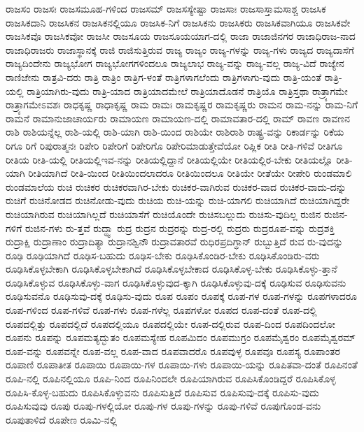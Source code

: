 {ರಾಜಸಂ
ರಾಜಸಃ
ರಾಜಸಮೂಹ-ಗಳಿಂದ
ರಾಜಸಮ್
ರಾಜಸಸ್ಯೇಷ್ಟಾ
ರಾಜಸಾಃ
ರಾಜಸಾಸ್ತಾಮಸಾಶ್ಚ
ರಾಜಸಿಕ
ರಾಜಸಿಕದಾನಿ
ರಾಜಸಿಕನ
ರಾಜಸಿಕನಲ್ಲಿಯೂ
ರಾಜಸಿಕ-ನಿಗೆ
ರಾಜಸಿಕನು
ರಾಜಸಿಕರು
ರಾಜಸಿಕವಾಗಿಯೂ
ರಾಜಸಿಕವೇ
ರಾಜಸಿಕವೊ
ರಾಜಸಿಕವೋ
ರಾಜಸೀ
ರಾಜಸೂಯ
ರಾಜಸೂಯಯಾಗ-ದಲ್ಲಿ
ರಾಜಾ
ರಾಜಾಜಿನಗರ
ರಾಜಾಧಿರಾಜ-ನಾದ
ರಾಜಾಧಿರಾಜರು
ರಾಜಾಸ್ಥಾನಕ್ಕೆ
ರಾಜಿ
ರಾಜಿಸುತ್ತಿರುವ
ರಾಜ್ಯ
ರಾಜ್ಯಂ
ರಾಜ್ಯ-ಗಳನ್ನು
ರಾಜ್ಯ-ಗಳು
ರಾಜ್ಯದ
ರಾಜ್ಯದಾಸೆಗೆ
ರಾಜ್ಯದಿಂದೇನು
ರಾಜ್ಯಭೋಗ
ರಾಜ್ಯಭೋಗಗಳಿಂದಲೂ
ರಾಜ್ಯಲಾಭ
ರಾಜ್ಯ-ವನ್ನು
ರಾಜ್ಯ-ವಲ್ಲ
ರಾಜ್ಯ-ವಿದೆ
ರಾಜ್ಯೇನ
ರಾಣಿಜೇನು
ರಾತ್ರವಿ-ದರು
ರಾತ್ರಿ
ರಾತ್ರಿಂ
ರಾತ್ರಿಗ-ಳಂತೆ
ರಾತ್ರಿಗಳಾಗಲೆಂದು
ರಾತ್ರಿಗಳಾಗು-ವುದು
ರಾತ್ರಿ-ಯಂತೆ
ರಾತ್ರಿ-ಯಲ್ಲಿ
ರಾತ್ರಿಯಾಗಿರು-ವುದು
ರಾತ್ರಿ-ಯಾದ
ರಾತ್ರಿಯಾದಮೇಲೆ
ರಾತ್ರಿಯಾದೊಡನೆ
ರಾತ್ರಿಯೊ
ರಾತ್ರಿಸ್ತಥಾ
ರಾತ್ರ್ಯಾಗಮೇ
ರಾತ್ರ್ಯಾಗಮೇಽವಶಃ
ರಾಧಕೃಷ್ಣ
ರಾಧಾಕೃಷ್ಣ
ರಾಮ
ರಾಮಃ
ರಾಮಕೃಷ್ಣರ
ರಾಮಕೃಷ್ಣರು
ರಾಮನ
ರಾಮ-ನನ್ನು
ರಾಮ-ನಿಗೆ
ರಾಮನೆ
ರಾಮಾನುಜಾಚಾರ್ಯರು
ರಾಮಾಯಣ
ರಾಮಾಯಣ-ದಲ್ಲಿ
ರಾಮಾವತಾರ-ದಲ್ಲಿ
ರಾಮ್
ರಾವಣ
ರಾವಣನ
ರಾಶಿ
ರಾಶಿಯನ್ನೆಲ್ಲ
ರಾಶಿ-ಯಲ್ಲಿ
ರಾಶಿ-ಯಾಗಿ
ರಾಶಿ-ಯಿಂದ
ರಾಶಿಯೇ
ರಾಶಿರಾಶಿ
ರಾಷ್ಟ್ರ-ವನ್ನು
ರಿಕಾರ್ಡನ್ನು
ರಿಕೆಯ
ರಿಗೂ
ರಿಗೆ
ರಿಪುರಾತ್ಮನಃ
ರಿಪೇರಿ
ರಿಪೇರಿಗೆ
ರಿಪೇರಿಗೊ
ರಿಪೇರಿಮಾಡುತ್ತೇವೆಯೋ
ರಿಪ್ಲಿಕ
ರೀತಿ
ರೀತಿ-ಗಳಿವೆ
ರೀತಿಗೂ
ರೀತಿಯ
ರೀತಿ-ಯಲ್ಲಿ
ರೀತಿಯಲ್ಲಿಇವ-ನನ್ನು
ರೀತಿಯಲ್ಲಿದ್ದಾನೆ
ರೀತಿಯಲ್ಲಿಯೇ
ರೀತಿಯಲ್ಲಿರ-ಬೇಕು
ರೀತಿಯಲ್ಲೊ
ರೀತಿ-ಯಾಗಿ
ರೀತಿಯಾಗಿದೆ
ರೀತಿ-ಯಿಂದ
ರೀತಿಯಿಂದಲಾದರೂ
ರೀತಿಯಿಂದಲೂ
ರೀತಿಯೇ
ರೀತೆಯೇ
ರೀಪೇರಿ
ರುಂಡಮಾಲಿ
ರುಂಡಮಾಲೆಯ
ರುಚಿ
ರುಚಿಕರ
ರುಚಿಕರವಾಗಿರ-ಬೇಕು
ರುಚಿಕರ-ವಾಗಿರುವ
ರುಚಿಕರ-ವಾದ
ರುಚಿಕರ-ವಾದು-ದನ್ನು
ರುಚಿಗೆ
ರುಚಿನೋಡದ
ರುಚಿನೋಡು-ವುದು
ರುಚಿಯ
ರುಚಿ-ಯನ್ನು
ರುಚಿ-ಯಾಗಲಿ
ರುಚಿಯಾಗಿದೆ
ರುಚಿಯಾಗಿದ್ದರೇ
ರುಚಿಯಾಗಿರುವ
ರುಚಿಯಾಗಿಲ್ಲದೆ
ರುಚಿಯಾಸೆಗೆ
ರುಚಿಯೊಂದೇ
ರುಚಿಸಬಲ್ಲುದು
ರುಚಿಸು-ವುದಿಲ್ಲ
ರುಜಿನ
ರುಜಿನ-ಗಳಿಗೆ
ರುಜಿನ-ಗಳು
ರು-ತ್ತವೆ
ರುದ್ಧ್ವಾ
ರುದ್ರ
ರುದ್ರನ
ರುದ್ರರನ್ನು
ರುದ್ರ-ರಲ್ಲಿ
ರುದ್ರರು
ರುದ್ರರೂಪ-ವನ್ನು
ರುದ್ರಶಕ್ತಿ
ರುದ್ರಾಕ್ಷಿ
ರುದ್ರಾಣಾಂ
ರುದ್ರಾದಿತ್ಯಾ
ರುದ್ರಾನಶ್ವಿನೌ
ರುದ್ರಾವತಾರವೆ
ರುಧಿರಪ್ರದಿಗ್ಧಾನ್
ರುಬ್ಬುತ್ತಿದೆ
ರುವ
ರು-ವುದನ್ನು
ರೂಢಿ
ರೂಢಿಯಾಗಿದೆ
ರೂಢಿಸ-ಬಹುದು
ರೂಢಿಸ-ಬೇಕು
ರೂಢಿಸಿಕೊಂಡಿರ-ಬೇಕು
ರೂಢಿಸಿಕೊಂಡಿರು-ವರು
ರೂಢಿಸಿಕೊಳ್ಳಬೇಕಾಗಿ
ರೂಢಿಸಿಕೊಳ್ಳಬೇಕಾಗಿದೆ
ರೂಢಿಸಿಕೊಳ್ಳಬೇಕಾದ
ರೂಢಿಸಿಕೊಳ್ಳ-ಬೇಕು
ರೂಢಿಸಿಕೊಳ್ಳು-ತ್ತಾನೆ
ರೂಢಿಸಿಕೊಳ್ಳುವ
ರೂಢಿಸಿಕೊಳ್ಳು-ವಾಗ
ರೂಢಿಸಿಕೊಳ್ಳುವುದ-ಕ್ಕಾಗಿ
ರೂಢಿಸಿಕೊಳ್ಳುವು-ದಕ್ಕೆ
ರೂಢಿಸುವ
ರೂಢಿಸುವನು
ರೂಢಿಸುವನೊ
ರೂಢಿಸುವು-ದಕ್ಕೆ
ರೂಢಿಸು-ವುದು
ರೂಪ
ರೂಪಂ
ರೂಪಕ್ಕೆ
ರೂಪ-ಗಳ
ರೂಪ-ಗಳನ್ನು
ರೂಪಗಳಾದರೂ
ರೂಪ-ಗಳಿಂದ
ರೂಪ-ಗಳಿವೆ
ರೂಪ-ಗಳು
ರೂಪ-ಗಳೆಲ್ಲ
ರೂಪಗಳೋ
ರೂಪದ
ರೂಪ-ದಂತೆ
ರೂಪ-ದಲ್ಲಿ
ರೂಪದಲ್ಲಿತ್ತು
ರೂಪದಲ್ಲಿದೆ
ರೂಪದಲ್ಲಿಯೂ
ರೂಪದಲ್ಲಿಯೇ
ರೂಪ-ದಲ್ಲಿರುವ
ರೂಪ-ದಿಂದ
ರೂಪದಿಂದಲೋ
ರೂಪನು
ರೂಪನ್ನು
ರೂಪಮತ್ಯದ್ಭುತಂ
ರೂಪಮಸ್ಯೇಹ
ರೂಪಮಿದಂ
ರೂಪಮುಗ್ರಂ
ರೂಪಮೈಶ್ವರಂ
ರೂಪಮೈಶ್ವರಮ್
ರೂಪ-ವನ್ನು
ರೂಪವನ್ನೇ
ರೂಪ-ವಲ್ಲ
ರೂಪ-ವಾದ
ರೂಪವಾದರೊ
ರೂಪವುಳ್ಳ
ರೂಪವೂ
ರೂಪಸ್ಯ
ರೂಪಾಂತರ
ರೂಪಾಣಿ
ರೂಪಾತೀತ
ರೂಪಾಯಿ
ರೂಪಾಯಿ-ಗಳ
ರೂಪಾಯಿ-ಗಳು
ರೂಪಾಯಿ-ಯನ್ನು
ರೂಪಿತವಾ-ದಂತೆ
ರೂಪಿನಂತೆ
ರೂಪಿ-ನಲ್ಲಿ
ರೂಪಿನಲ್ಲಿಯೂ
ರೂಪಿ-ನಿಂದ
ರೂಪಿನಿಂದಲೇ
ರೂಪಿಯಾಗಿರುವ
ರೂಪಿಸಿಕೊಂಡಿದ್ದರೆ
ರೂಪಿಸಿಕೊಳ್ಳ
ರೂಪಿಸಿ-ಕೊಳ್ಳ-ಬಹುದು
ರೂಪಿಸಿಕೊಳ್ಳುವನು
ರೂಪಿಸುತ್ತಿದೆ
ರೂಪಿಸುವ
ರೂಪಿಸುವು-ದಕ್ಕೆ
ರೂಪಿಸು-ವುದು
ರೂಪಿಸುವುವು
ರೂಪು
ರೂಪು-ಗಳಲ್ಲಿಯೋ
ರೂಪು-ಗಳ
ರೂಪು-ಗಳನ್ನು
ರೂಪು-ಗಳಿವೆ
ರೂಪುಗೊಂಡ-ವನು
ರೂಪುತಾಳಿದೆ
ರೂಪೇಣ
ರೂಮಿ-ನಲ್ಲಿ
}
